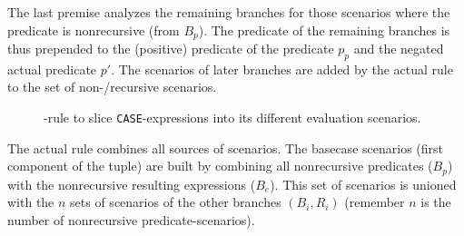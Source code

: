 The last premise analyzes the remaining branches for those scenarios where the predicate is nonrecursive (from $B_p$). The predicate of the remaining branches is thus prepended to the (positive) predicate of the predicate $p_p$ and the negated actual predicate $p'$. The scenarios of later branches are added by the actual rule to the set of non-/recursive scenarios.

\begin{figure}[h!]
    \centering\footnotesize

    \caption{\RWHEN-rule to slice \texttt{CASE}-expressions into its different evaluation scenarios.}
    \label{rule:when}
\end{figure}

The actual rule combines all sources of scenarios. The basecase scenarios (first component of the tuple) are built by combining all nonrecursive predicates ($B_p$) with the nonrecursive resulting expressions ($B_e$). This set of scenarios is unioned with the $n$ sets of scenarios of the other branches $(B_i, R_i)$ (remember $n$ is the number of nonrecursive predicate-scenarios).

